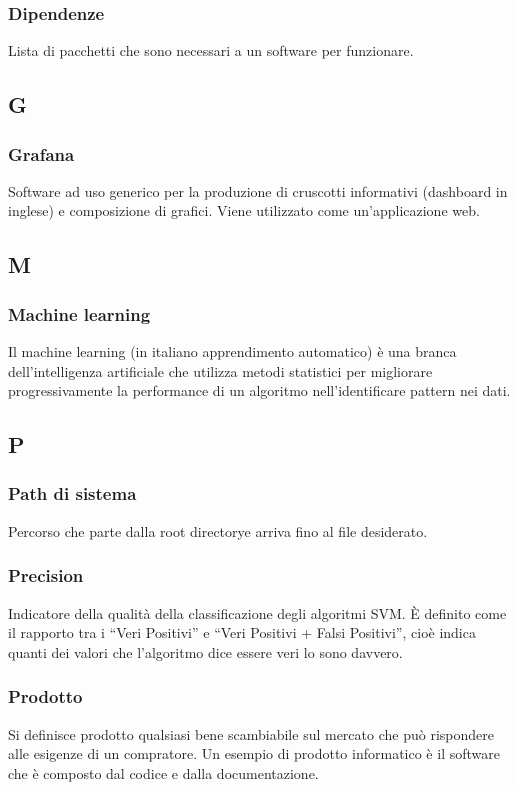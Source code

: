 \subsubsection*{Dipendenze}
Lista di pacchetti che sono necessari a un software per funzionare.

\subsection*{G}
\subsubsection*{Grafana}
Software ad uso generico per la produzione di cruscotti informativi (dashboard in inglese) e composizione di grafici. Viene utilizzato come un'applicazione web.

\subsection*{M}
\subsubsection*{Machine learning}
Il machine learning (in italiano apprendimento automatico) è una branca dell'intelligenza artificiale che utilizza metodi statistici per migliorare progressivamente la performance di un algoritmo nell'identificare pattern nei dati.

\subsection*{P}
\subsubsection*{Path di sistema}
Percorso che parte dalla root directory\glosp e arriva fino al file desiderato.

\subsubsection*{Precision}
Indicatore della qualità della classificazione degli algoritmi SVM. È definito come il rapporto tra i “Veri Positivi” e “Veri Positivi + Falsi Positivi”, cioè indica quanti dei valori che l'algoritmo dice essere veri lo sono davvero.

\subsubsection*{Prodotto}
Si definisce prodotto qualsiasi bene scambiabile sul mercato che può rispondere alle esigenze di un compratore. Un esempio di prodotto informatico è il software che è composto dal codice e dalla documentazione.	
	
